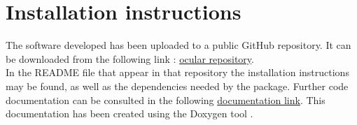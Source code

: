 \section{Installation instructions}
The software developed has been uploaded to a public GitHub repository. It can be downloaded from the following link :  \href{http://github.com/irenesanznieto/ocular}{\color{blue}\underline {ocular repository}}. 
\\

In the README file that appear in that repository the installation instructions may be found, as well as the dependencies needed by the package. 
Further code documentation can be consulted in the following   \href{http://github.com/irenesanznieto/ocular}{\color{blue}\underline {documentation link}}. This documentation has been created using the Doxygen tool \cite{doxygen}.